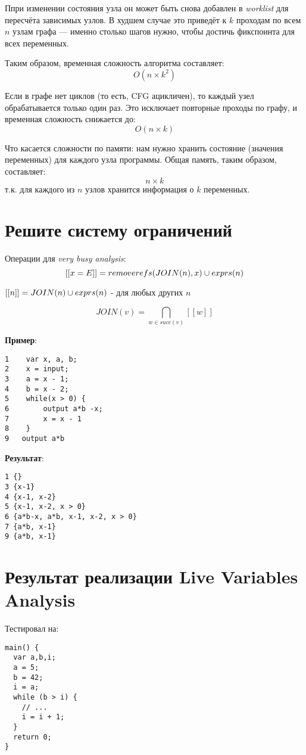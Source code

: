 \documentclass{report}
\begin{document}
Ппри изменении состояния узла он может быть снова добавлен в \textit{worklist} для пересчёта зависимых узлов. В худшем случае это приведёт к $ k $ проходам по всем $ n $ узлам графа — именно столько шагов нужно, чтобы достичь фикспоинта для всех переменных.

Таким образом, временная сложность алгоритма составляет:
$$
O(n \times k^2)
$$

Если в графе нет циклов (то есть, CFG ацикличен), то каждый узел обрабатывается только один раз. Это исключает повторные проходы по графу, и временная сложность снижается до:
$$
O(n \times k)
$$

Что касается сложности по памяти: нам нужно хранить состояние (значения переменных) для каждого узла программы. Общая память, таким образом, составляет:
$$
n \times k
$$
т.к. для каждого из $ n $ узлов хранится информация о $ k $ переменных.

\section{Решите систему ограничений}

Операции для \textit{very busy analysis}:
$$
[[x = E]] = removerefs(JOIN(n), x) \space \cup \space exprs(n)
$$

$[[n]] = JOIN(n) \space \cup \space exprs(n) $ - для любых других $n$

$$JOIN(v) = \bigcap_{w \in succ(v)} [[w]] $$

\textbf{Пример}:
\begin{lstlisting}
1    var x, a, b;
2    x = input;
3    a = x - 1;
4    b = x - 2;
5    while(x > 0) {
6        output a*b -x;
7        x = x - 1
8    }
9   output a*b
\end{lstlisting}

\textbf{Результат}:
\begin{lstlisting}
1 {}
3 {x-1}
4 {x-1, x-2}
5 {x-1, x-2, x > 0}
6 {a*b-x, a*b, x-1, x-2, x > 0}
7 {a*b, x-1}
9 {a*b, x-1}
\end{lstlisting}

\section{Результат реализации Live Variables Analysis}

Тестировал на:
\begin{lstlisting}
main() {
  var a,b,i;
  a = 5;
  b = 42;
  i = a;
  while (b > i) {
    // ...
    i = i + 1;
  }
  return 0;
}
\end{lstlisting}
\end{document}

